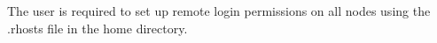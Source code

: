 \begin{itemize}
%
%
%
%
%
%
%

The user is required to set up remote login permissions on all nodes
using the .rhosts file in the home directory.

\end{itemize}

